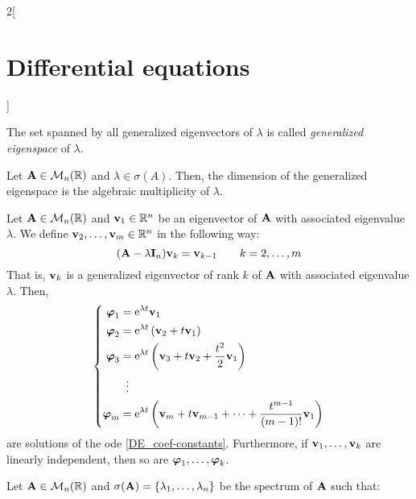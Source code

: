\documentclass[../../../main.tex]{subfiles}
\begin{document}
\begin{multicols}{2}[\section{Differential equations}]
\begin{definition}
    The set spanned by all generalized eigenvectors of $\lambda$ is called \textit{generalized eigenspace} of $\lambda$.
  \end{definition}
  \begin{prop}
    Let $\boldsymbol{\mathrm{A}}\in\mathcal{M}_n(\mathbb{R})$ and $\lambda\in\sigma(A)$. Then, the dimension of the generalized eigenspace is the algebraic multiplicity of $\lambda$.
  \end{prop}
  \begin{lemma}
    Let $\boldsymbol{\mathrm{A}}\in\mathcal{M}_n(\mathbb{R})$ and $\boldsymbol{\mathrm{v}}_1\in\mathbb{R}^n$ be an eigenvector of $\boldsymbol{\mathrm{A}}$ with associated eigenvalue $\lambda$. We define $\boldsymbol{\mathrm{v}}_2,\ldots,\boldsymbol{\mathrm{v}}_m\in\mathbb{R}^n$ in the following way: $$(\boldsymbol{\mathrm{A}}-\lambda\boldsymbol{\mathrm{I}}_n)\boldsymbol{\mathrm{v}}_k=\boldsymbol{\mathrm{v}}_{k-1}\qquad k=2,\ldots, m$$
    That is, $\boldsymbol{\mathrm{v}}_k$ is a generalized eigenvector of rank $k$ of $\boldsymbol{\mathrm{A}}$ with associated eigenvalue $\lambda$. Then,
    $$
      \left\{
      \begin{aligned}
        \boldsymbol{\mathrm{\varphi}}_1 & =\mathrm{e}^{\lambda t}\boldsymbol{\mathrm{v}}_1                                                                                          \\
        \boldsymbol{\mathrm{\varphi}}_2 & =\mathrm{e}^{\lambda t}\left(\boldsymbol{\mathrm{v}}_2+t\boldsymbol{\mathrm{v}}_1\right)                                                       \\
        \boldsymbol{\mathrm{\varphi}}_3 & =\mathrm{e}^{\lambda t}\left(\boldsymbol{\mathrm{v}}_3+t\boldsymbol{\mathrm{v}}_2+\frac{t^2}{2}\boldsymbol{\mathrm{v}}_1\right)                     \\
                                   & \;\;\vdots                                                                                                                    \\
        \boldsymbol{\mathrm{\varphi}}_m & =\mathrm{e}^{\lambda t}\left(\boldsymbol{\mathrm{v}}_m+t\boldsymbol{\mathrm{v}}_{m-1}+\cdots+\frac{t^{m-1}}{(m-1)!}\boldsymbol{\mathrm{v}}_1\right) \\
      \end{aligned}
      \right.
    $$
    are solutions of the ode \eqref{DE_coef-constants}. Furthermore, if $\boldsymbol{\mathrm{v}}_1,\ldots,\boldsymbol{\mathrm{v}}_k$ are linearly independent, then so are $\boldsymbol{\mathrm{\varphi}}_1,\ldots,\boldsymbol{\mathrm{\varphi}}_k$.
  \end{lemma}
  \begin{corollary}
    Let $\boldsymbol{\mathrm{A}}\in\mathcal{M}_n(\mathbb{R})$ and $\sigma(\boldsymbol{\mathrm{A}})=\{\lambda_1,\ldots,\lambda_n\}$ be the spectrum of $\boldsymbol{\mathrm{A}}$ such that:

\end{corollary}
\end{multicols}
\end{document}
